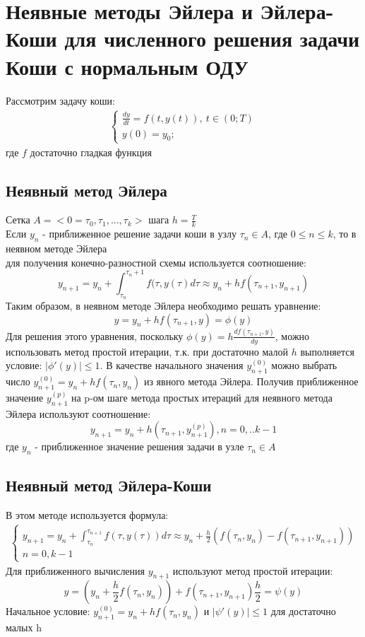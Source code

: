 \documentclass[__main__.tex]{subfiles}
\begin{document}
\section{Неявные методы Эйлера и Эйлера-Коши для численного решения задачи Коши с нормальным ОДУ}
Рассмотрим задачу коши:
\begin{align*} 
\begin{cases}
\frac{dy}{dt} = f(t,y(t)) , \ t \in (0;T) \\
y(0) = y_0;
\end{cases}
\end{align*}
где $f$ достаточно гладкая функция
\subsection*{Неявный метод Эйлера}
Сетка $ A = <0=\tau_0,\tau_1,...,\tau_k>$ шага $ h = \frac{T}{k}$ \\
Если $y_n$ - приближенное решение задачи коши в узлу $\tau_n \in A$, где $0 \leq n \leq k$, то в неявном методе Эйлера \\
для получения конечно-разностной схемы используется соотношение: \\
$$ y_{n+1} = y_n + \int_{\tau_n}^{\tau_n+1} f(\tau, y(\tau)d\tau \approx y_n + hf(\tau_{n+1},y_{n+1})$$
Таким образом, в неявном методе Эйлера необходимо решать уравнение: \\
$$y = y_n + hf(\tau_{n+1},y) = \phi(y) $$
Для решения этого уравнения, поскольку $ \phi(y) = h\frac{df(\tau_{n+1},y)}{dy}$, можно использовать метод простой итерации, т.к. при достаточно малой $h$
выполняется условие: $|\phi'(y)| \leq 1 $. В качестве начального значения $y_{n+1}^{(0)}$ можно выбрать число $y_{n+1}^{(0)} = y_n + hf(\tau_n,y_n)$ из явного метода Эйлера.
Получив приближенное значение $y_{n+1}^{(p)}$ на p-ом шаге метода простых итераций для неявного метода Эйлера используют соотношение:
$$y_{n+1} = y_n + h(\tau_{n+1},y_{n+1}^{(p)}), n = 0,..k-1$$
где $y_n$ - приближенное значение решения задачи в узле $\tau_n \in A$
\subsection*{Неявный метод Эйлера-Коши}
В этом методе используется формула:
\begin{align*}
\begin{cases}
y_{n+1} = y_n + \int_{\tau_n}^{\tau_{n+1}}f(\tau,y(\tau))d\tau \approx y_n + \frac{h}{2}(f(\tau_n,y_n)-f(\tau_{n+1},y_{n+1})) \\
n = 0,k-1
\end{cases}
\end{align*}
Для приближенного вычисления $y_{n+1}$ используют метод простой итерации:
$$y = (y_n + \frac{h}{2}f(\tau_n,y_n)) + f(\tau_{n+1},y_{n+1})\frac{h}{2} = \psi(y) $$
Начальное условие: $y_{n+1}^{(0)} = y_n + hf(\tau_n,y_n)$ и $|\psi'(y)| \leq 1$ для достаточно малых h
\end{document}
